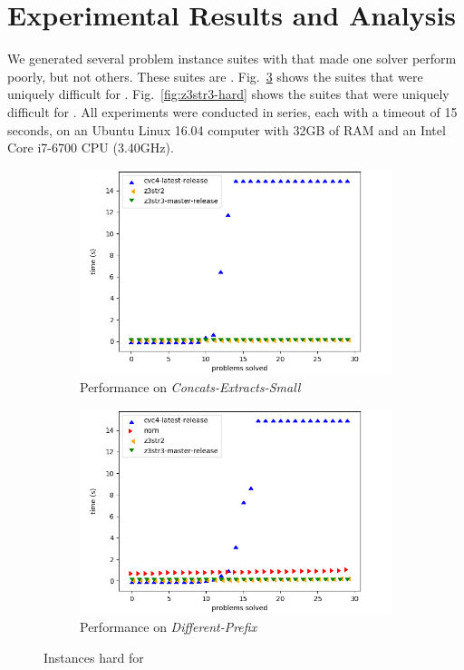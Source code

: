 \section{Experimental Results and Analysis}
\label{sec:data}

We generated several problem instance suites with \fuzzer{} that made one
solver perform poorly, but not others. These suites are
\theSuites{}. Fig.~\ref{fig:cvc-hard} shows the suites that were
uniquely difficult for \cvc{}. Fig.~\ref{fig:z3str3-hard} shows the
suites that were uniquely difficult for \us{}. All experiments were
conducted in series, each with a timeout of 15 seconds,
on an Ubuntu Linux 16.04 computer with 32GB of RAM and an
Intel\textregistered{} Core\texttrademark{} i7-6700 CPU (3.40GHz).

\begin{figure}[h]
    \begin{subfigure}{.5\textwidth}
        \includegraphics[width=\textwidth]{data/graphs/concats-extracts-small.png}
        \caption{Performance on \textit{Concats-Extracts-Small}}
        \label{fig:concats-extracts-small}
    \end{subfigure}
    \begin{subfigure}{.5\textwidth}
        \includegraphics[width=\textwidth]{data/graphs/different-prefix.png}
        \caption{Performance on \textit{Different-Prefix}}
        \label{fig:different-prefix}
    \end{subfigure}
    \caption{Instances hard for \cvc{}}
    \label{fig:cvc-hard}


\end{figure}
